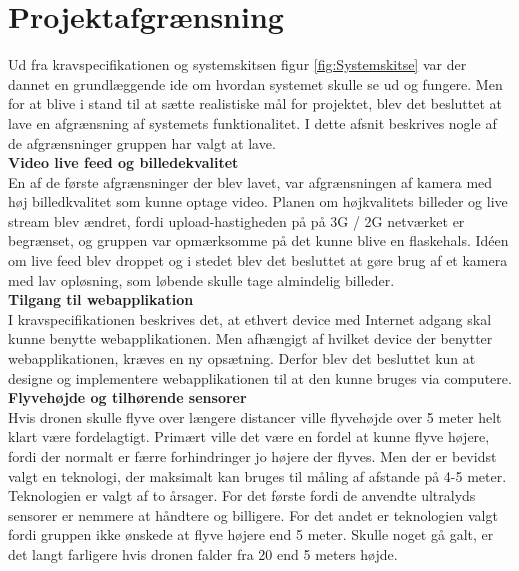 \chapter{Projektafgrænsning}

Ud fra kravspecifikationen og systemskitsen figur \ref{fig:Systemskitse} var der dannet en grundlæggende ide om hvordan systemet skulle se ud og fungere. Men for at blive i stand til at sætte realistiske mål for projektet, blev det besluttet at lave en afgrænsning af systemets funktionalitet. I dette afsnit beskrives nogle af de afgrænsninger gruppen har valgt at lave. \\


\textbf{Video live feed og billedekvalitet}\\
En af de første afgrænsninger der blev lavet, var afgrænsningen af kamera med høj billedkvalitet som kunne optage video. Planen om højkvalitets billeder og live stream blev ændret, fordi upload-hastigheden på på 3G / 2G netværket er begrænset, og gruppen var opmærksomme på det kunne blive en flaskehals. Idéen om live feed blev droppet og i stedet blev det besluttet at gøre brug af et kamera med lav opløsning, som løbende skulle tage almindelig billeder.\\

\textbf{Tilgang til webapplikation}\\
I kravspecifikationen beskrives det, at ethvert device med Internet adgang skal kunne benytte webapplikationen. Men afhængigt af hvilket device der benytter webapplikationen, kræves en ny opsætning. Derfor blev det besluttet kun at designe og implementere webapplikationen til at den kunne bruges via computere.\\

\textbf{Flyvehøjde og tilhørende sensorer}\\
Hvis dronen skulle flyve over længere distancer ville flyvehøjde over 5 meter helt klart være fordelagtigt. Primært ville det være en fordel at kunne flyve højere, fordi der normalt er færre forhindringer jo højere der flyves. Men der er bevidst valgt en teknologi, der maksimalt kan bruges til måling af afstande på 4-5 meter. Teknologien er valgt af to årsager. For det første fordi de anvendte ultralyds sensorer er nemmere at håndtere og billigere. For det andet er teknologien valgt fordi gruppen ikke ønskede at flyve højere end 5 meter. Skulle noget gå galt, er det langt farligere hvis dronen falder fra 20 end 5 meters højde.  
